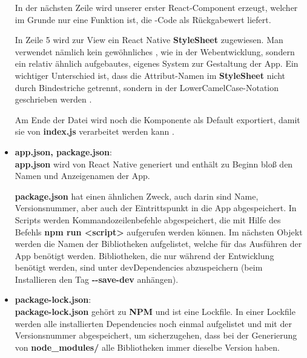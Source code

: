 \begin{itemize}
In der nächsten Zeile wird unserer erster React-Component erzeugt, welcher im Grunde nur eine
Funktion ist, die \underline{}-Code als Rückgabewert liefert.

In Zeile 5 wird zur View ein React Native \textbf{StyleSheet} zugewiesen. Man verwendet nämlich kein
gewöhnliches \underline{}, wie in der Webentwicklung, sondern ein relativ ähnlich aufgebautes,
eigenes System zur Gestaltung der App. Ein wichtiger Unterschied ist, dass die Attribut-Namen im
\textbf{StyleSheet} nicht durch Bindestriche getrennt, sondern in der LowerCamelCase-Notation geschrieben
werden \cite{camelCaseNotation}.

Am Ende der Datei wird noch die Komponente als Default exportiert, damit sie von \textbf{index.js} verarbeitet
werden kann \cite{jsModules}.

\item \textbf{app.json, package.json}:\\
\textbf{app.json} wird von React Native generiert und enthält zu Beginn bloß den Namen und Anzeigenamen der
App.


\textbf{package.json} hat einen ähnlichen Zweck, auch darin sind Name, Versionsnummer, aber auch der
Eintrittspunkt in die App abgespeichert. In Scripts werden Kommandozeilenbefehle abgespeichert, die
mit Hilfe des Befehls \textbf{npm run <script>} aufgerufen werden können. Im nächsten Objekt werden die
Namen der Bibliotheken aufgelistet, welche für das Ausführen der App benötigt werden. Bibliotheken,
die nur während der Entwicklung benötigt werden, sind unter devDependencies abzuspeichern (beim
Installieren den Tag \textbf{-{}-save-dev} anhängen).

\item \textbf{package-lock.json}:\\
\textbf{package-lock.json} gehört zu \textbf{NPM} und ist eine Lockfile. In einer Lockfile werden alle installierten
Dependencies noch einmal aufgelistet und mit der Versionsnummer abgespeichert, um sicherzugehen,
dass bei der Generierung von \textbf{node\_modules/} alle Bibliotheken immer dieselbe Version haben.


\end{itemize}
